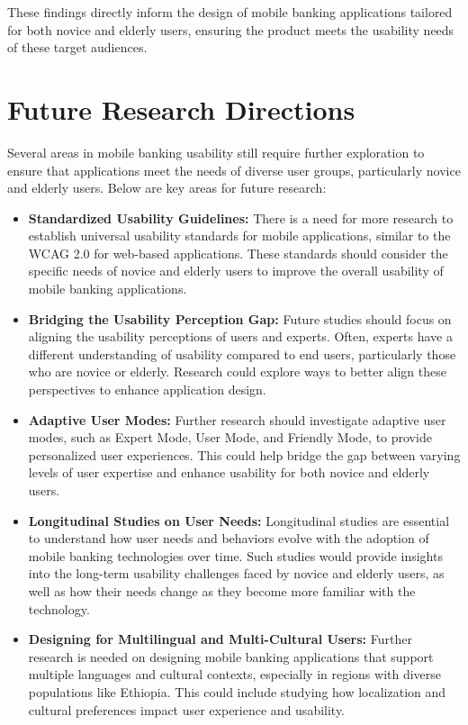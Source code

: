 \documentclass[a4paper,12pt]{report}
\begin{document}
These findings directly inform the design of mobile banking applications tailored for both novice and elderly users, ensuring the product meets the usability needs of these target audiences.

\section{Future Research Directions}

Several areas in mobile banking usability still require further exploration to ensure that applications meet the needs of diverse user groups, particularly novice and elderly users. Below are key areas for future research:

\begin{itemize}
  \item \textbf{Standardized Usability Guidelines:} There is a need for more research to establish universal usability standards for mobile applications, similar to the WCAG 2.0 for web-based applications. These standards should consider the specific needs of novice and elderly users to improve the overall usability of mobile banking applications.

  \item \textbf{Bridging the Usability Perception Gap:} Future studies should focus on aligning the usability perceptions of users and experts. Often, experts have a different understanding of usability compared to end users, particularly those who are novice or elderly. Research could explore ways to better align these perspectives to enhance application design.

  \item \textbf{Adaptive User Modes:} Further research should investigate adaptive user modes, such as Expert Mode, User Mode, and Friendly Mode, to provide personalized user experiences. This could help bridge the gap between varying levels of user expertise and enhance usability for both novice and elderly users.

  \item \textbf{Longitudinal Studies on User Needs:} Longitudinal studies are essential to understand how user needs and behaviors evolve with the adoption of mobile banking technologies over time. Such studies would provide insights into the long-term usability challenges faced by novice and elderly users, as well as how their needs change as they become more familiar with the technology.

  \item \textbf{Designing for Multilingual and Multi-Cultural Users:} Further research is needed on designing mobile banking applications that support multiple languages and cultural contexts, especially in regions with diverse populations like Ethiopia. This could include studying how localization and cultural preferences impact user experience and usability.


\end{itemize}
\end{document}
